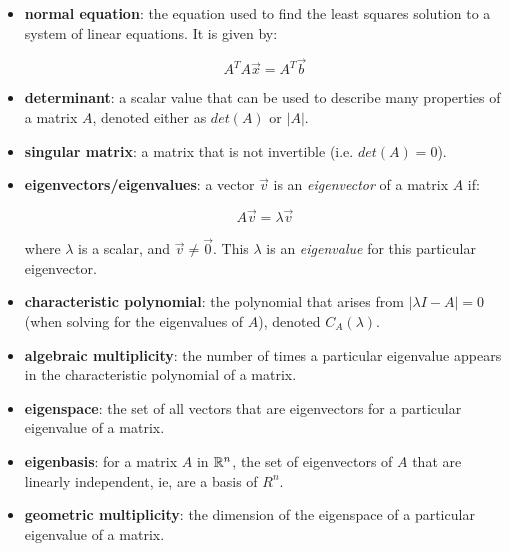 \documentclass[12pt]{article}
\begin{document}
{{\begin{itemize}
        \item \textbf{normal equation}: the equation used to find the least squares solution to a system of linear equations. It is given by:
        
        \begin{equation}
            A^TA\Vec{x} = A^T\Vec{b}
        \end{equation}

        \item \textbf{determinant}: a scalar value that can be used to describe many properties of a matrix $A$, denoted either as $det(A)$ or $|A|$.
        
        \item \textbf{singular matrix}: a matrix that is not invertible (i.e. $det(A) = 0$).

        \item \textbf{eigenvectors/eigenvalues}: a vector $\vec{v}$ is an \textit{eigenvector} of a matrix $A$ if:
        
        \begin{equation}
            A\vec{v} = \lambda \vec{v}
        \end{equation}

        where $\lambda$ is a scalar, and $\vec{v}\neq\vec{0}$. This $\lambda$ is an \textit{eigenvalue} for this particular eigenvector.

        \item \textbf{characteristic polynomial}: the polynomial that arises from $|\lambda I - A| = 0$ (when solving for the eigenvalues of $A$), denoted $C_A(\lambda)$.
        
        \item \textbf{algebraic multiplicity}: the number of times a particular eigenvalue appears in the characteristic polynomial of a matrix.
        
        \item \textbf{eigenspace}: the set of all vectors that are eigenvectors for a particular eigenvalue of a matrix.
        
        \item \textbf{eigenbasis}: for a matrix $A$ in $\mathbb{R}^n$, the set of eigenvectors of $A$ that are linearly independent, ie, are a basis of $R^n$.
        
        \item \textbf{geometric multiplicity}: the dimension of the eigenspace of a particular eigenvalue of a matrix.
        

\end{itemize}}}
\end{document}
